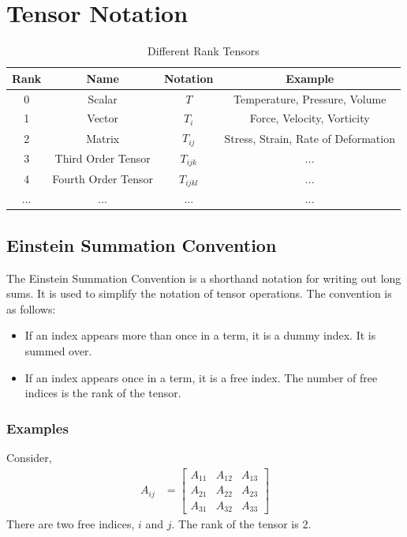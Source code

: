 \section{Tensor Notation}
\begin{table}[H]
    \centering
    \caption{Different Rank Tensors}
    \begin{tabular}{cccc}
        \toprule
        Rank & Name & Notation & Example \\
        \midrule
        0 & Scalar & $T$ & Temperature, Pressure, Volume \\
        1 & Vector & $T_i$ & Force, Velocity, Vorticity \\
        2 & Matrix & $T_{ij}$ & Stress, Strain, Rate of Deformation \\
        3 & Third Order Tensor & $T_{ijk}$ & ... \\
        4 & Fourth Order Tensor & $T_{ijkl}$ & ... \\
        ... & ... & ... & ... \\
        \bottomrule
    \end{tabular}
\end{table}

\subsection{Einstein Summation Convention}
The Einstein Summation Convention is a shorthand notation for writing out long sums. It is used to simplify the notation of tensor operations. The convention is as follows:
\begin{itemize}
    \item If an index appears more than once in a term, it is a dummy index. It is summed over.
    \item If an index appears once in a term, it is a free index. The number of free indices is the rank of the tensor.
\end{itemize}

\subsubsection{Examples}

Consider,
\begin{align*}
    A_{ij} &=
    \begin{bmatrix}
        A_{11} & A_{12} & A_{13} \\
        A_{21} & A_{22} & A_{23} \\
        A_{31} & A_{32} & A_{33}
    \end{bmatrix} 
\end{align*}
There are two free indices, $i$ and $j$. The rank of the tensor is 2. \\


